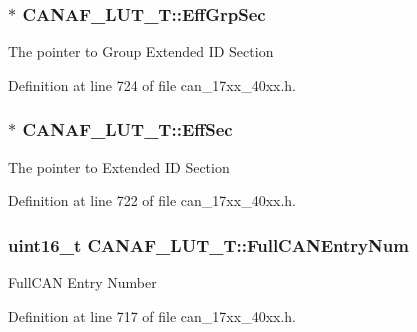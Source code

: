 \subsubsection[{\texorpdfstring{Eff\+Grp\+Sec}{EffGrpSec}}]{$\ast$ C\+A\+N\+A\+F\+\_\+\+L\+U\+T\+\_\+\+T\+::\+Eff\+Grp\+Sec}\hypertarget{structCANAF__LUT__T_a62a98cfd049ea67dd3b01d6e6f3871d5}{}\label{structCANAF__LUT__T_a62a98cfd049ea67dd3b01d6e6f3871d5}
The pointer to Group Extended ID Section 

Definition at line 724 of file can\+\_\+17xx\+\_\+40xx.\+h.

\subsubsection[{\texorpdfstring{Eff\+Sec}{EffSec}}]{$\ast$ C\+A\+N\+A\+F\+\_\+\+L\+U\+T\+\_\+\+T\+::\+Eff\+Sec}\hypertarget{structCANAF__LUT__T_a30b5814a21e36ca7d9711c0752ff3f4e}{}\label{structCANAF__LUT__T_a30b5814a21e36ca7d9711c0752ff3f4e}
The pointer to Extended ID Section 

Definition at line 722 of file can\+\_\+17xx\+\_\+40xx.\+h.

\subsubsection[{\texorpdfstring{Full\+C\+A\+N\+Entry\+Num}{FullCANEntryNum}}]{\setlength{\rightskip}{0pt plus 5cm}uint16\+\_\+t C\+A\+N\+A\+F\+\_\+\+L\+U\+T\+\_\+\+T\+::\+Full\+C\+A\+N\+Entry\+Num}\hypertarget{structCANAF__LUT__T_ac8dfb97883a903ee82362da9abd4e863}{}\label{structCANAF__LUT__T_ac8dfb97883a903ee82362da9abd4e863}
Full\+C\+AN Entry Number 

Definition at line 717 of file can\+\_\+17xx\+\_\+40xx.\+h.

